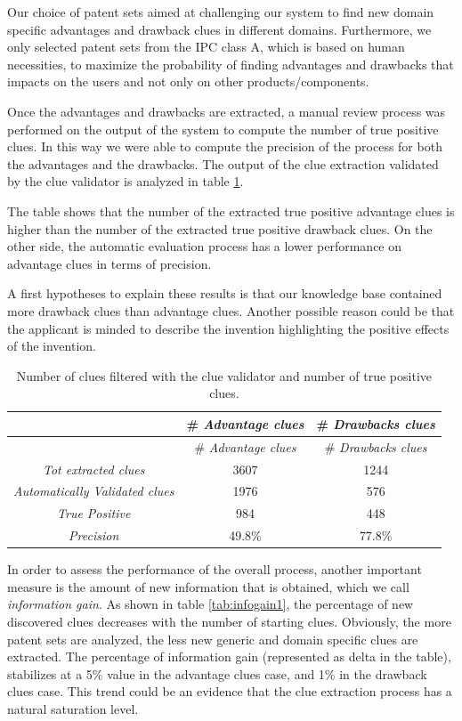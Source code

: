 \documentclass[]{book}
\theoremstyle{definition}
\theoremstyle{definition}
\theoremstyle{definition}
\theoremstyle{remark}
\begin{document}
Our choice of patent sets aimed at challenging our system to find new
domain specific advantages and drawback clues in different domains.
Furthermore, we only selected patent sets from the IPC class A, which is
based on human necessities, to maximize the probability of finding
advantages and drawbacks that impacts on the users and not only on other
products/components.

Once the advantages and drawbacks are extracted, a manual review process
was performed on the output of the system to compute the number of true
positive clues. In this way we were able to compute the precision of the
process for both the advantages and the drawbacks. The output of the
clue extraction validated by the clue validator is analyzed in table
\ref{tab:advdrwarticlecluemeas}.

The table shows that the number of the extracted true positive advantage
clues is higher than the number of the extracted true positive drawback
clues. On the other side, the automatic evaluation process has a lower
performance on advantage clues in terms of precision.

A first hypotheses to explain these results is that our knowledge base
contained more drawback clues than advantage clues. Another possible
reason could be that the applicant is minded to describe the invention
highlighting the positive effects of the invention.

\begin{longtable}[]{@{}ccc@{}}
\caption{\label{tab:advdrwarticlecluemeas} Number of clues filtered with the
clue validator and number of true positive clues.}\tabularnewline
\toprule
& \# \emph{Advantage clues} & \# \emph{Drawbacks clues}\tabularnewline
\midrule
\endfirsthead
\toprule
& \# \emph{Advantage clues} & \# \emph{Drawbacks clues}\tabularnewline
\midrule
\endhead
\emph{Tot extracted clues} & 3607 & 1244\tabularnewline
\emph{Automatically Validated clues} & 1976 & 576\tabularnewline
\emph{True Positive} & 984 & 448\tabularnewline
\emph{Precision} & 49.8\% & 77.8\%\tabularnewline
\bottomrule
\end{longtable}

In order to assess the performance of the overall process, another
important measure is the amount of new information that is obtained,
which we call \emph{information gain}. As shown in table
\ref{tab:infogain1}, the percentage of new discovered clues decreases
with the number of starting clues. Obviously, the more patent sets are
analyzed, the less new generic and domain specific clues are extracted.
The percentage of information gain (represented as delta in the table),
stabilizes at a 5\% value in the advantage clues case, and 1\% in the
drawback clues case. This trend could be an evidence that the clue
extraction process has a natural saturation level.
\end{document}
